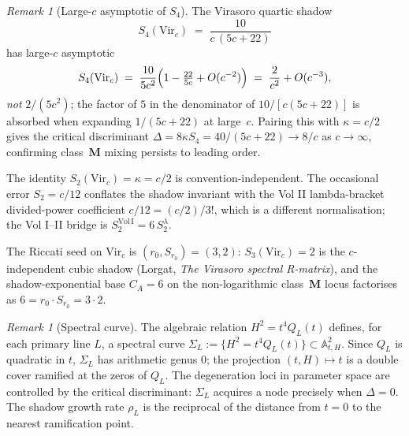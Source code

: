 \documentclass[11pt]{article}
\theoremstyle{plain}
\theoremstyle{definition}
\theoremstyle{remark}
\newtheorem{remark}[theorem]{Remark}
\begin{document}
\begin{remark}[Large-$c$ asymptotic of $S_4$]
\label{rem:s4-large-c-asymptotic}
The Virasoro quartic shadow
\[
 S_4(\mathrm{Vir}_c) \;=\; \frac{10}{c\,(5c+22)}
\]
has large-$c$ asymptotic
\[
 S_4(\mathrm{Vir}_c)
 \;=\; \frac{10}{5c^2}\Bigl(1 - \tfrac{22}{5c}
  + O(c^{-2})\Bigr)
 \;=\; \frac{2}{c^2} + O(c^{-3}),
\]
\emph{not} $2/(5c^2)$; the factor of $5$ in the denominator of
$10/[c(5c+22)]$ is absorbed when expanding $1/(5c+22)$ at
large~$c$.  Pairing this with $\kappa = c/2$ gives the
critical discriminant
$\Delta = 8\kappa S_4 = 40/(5c+22) \to 8/c$ as $c \to \infty$,
confirming class~$\mathbf{M}$ mixing persists to leading order.

The identity $S_2(\mathrm{Vir}_c) = \kappa = c/2$ is
convention-independent.  The occasional error
$S_2 = c/12$ conflates the shadow invariant with the Vol II
lambda-bracket divided-power coefficient $c/12 = (c/2)/3!$,
which is a different normalisation; the Vol I--II bridge is
$S_2^{\mathrm{Vol\,I}} = 6\,S_2^{\lambda}$.

The Riccati seed on $\mathrm{Vir}_c$ is
$(r_0, S_{r_0}) = (3, 2)$: $S_3(\mathrm{Vir}_c) = 2$ is the
$c$-independent cubic shadow (Lorgat, \textit{The Virasoro
spectral R-matrix}), and the shadow-exponential base
$C_A = 6$ on the non-logarithmic class~$\mathbf{M}$ locus
factorises as $6 = r_0 \cdot S_{r_0} = 3 \cdot 2$.
\end{remark}

\begin{remark}[Spectral curve]
The algebraic relation $H^2 = t^4 Q_L(t)$ defines, for each
primary line $L$, a spectral curve
$\Sigma_L := \{H^2 = t^4 Q_L(t)\} \subset \mathbb{A}^2_{t,H}$.
Since $Q_L$ is quadratic in $t$, $\Sigma_L$ has arithmetic
genus $0$; the projection $(t,H) \mapsto t$ is a double cover
ramified at the zeros of $Q_L$. The degeneration loci in
parameter space are controlled by the critical discriminant:
$\Sigma_L$ acquires a node precisely when $\Delta = 0$.
The shadow growth rate $\rho_L$ is the reciprocal of the
distance from $t = 0$ to the nearest ramification point.
\end{remark}

\ifdefined\shadowtowervtwoincluded
\else
\end{document}
